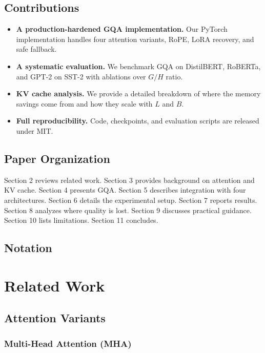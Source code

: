 \subsection{Contributions}

\begin{itemize}
\item \textbf{A production-hardened GQA implementation.} Our PyTorch implementation
  handles four attention variants, RoPE, LoRA recovery, and safe fallback.
\item \textbf{A systematic evaluation.} We benchmark GQA on DistilBERT, RoBERTa, and
  GPT-2 on SST-2 with ablations over $G / H$ ratio.
\item \textbf{KV cache analysis.} We provide a detailed breakdown of where the memory
  savings come from and how they scale with $L$ and $B$.
\item \textbf{Full reproducibility.} Code, checkpoints, and evaluation scripts are
  released under MIT.

\end{itemize}
\subsection{Paper Organization}

Section 2 reviews related work. Section 3 provides background on attention 
and KV cache. Section 4 presents GQA. Section 5 describes integration with 
four architectures. Section 6 details the experimental setup. Section 7 
reports results. Section 8 analyzes where quality is lost. Section 9 
discusses practical guidance. Section 10 lists limitations. Section 11 
concludes.



\subsection{Notation}



\section{Related Work}

\subsection{Attention Variants}

\subsubsection{Multi-Head Attention (MHA)}

